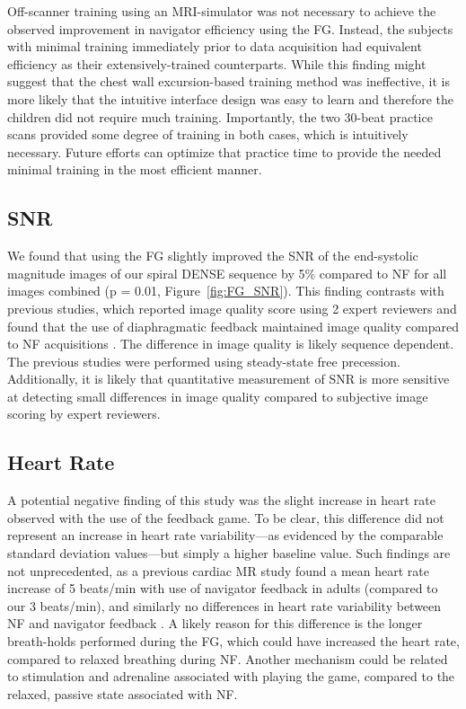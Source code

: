 		Off-scanner training using an MRI-simulator was not necessary to achieve the observed improvement in navigator efficiency using the FG. Instead, the subjects with minimal training immediately prior to data acquisition had equivalent efficiency as their extensively-trained counterparts. While this finding might suggest that the chest wall excursion-based training method was ineffective, it is more likely that the intuitive interface design was easy to learn and therefore the children did not require much training. Importantly, the two 30-beat practice scans provided some degree of training in both cases, which is intuitively necessary. Future efforts can optimize that practice time to provide the needed minimal training in the most efficient manner.
	
	\subsection{SNR}
		We found that using the FG slightly improved the SNR of the end-systolic magnitude images of our spiral DENSE sequence by 5\% compared to NF for all images combined (p = 0.01, Figure~\ref{fig:FG_SNR}). This finding contrasts with previous studies, which reported image quality score using 2 expert reviewers and found that the use of diaphragmatic feedback maintained image quality compared to NF acquisitions \cite{Feuerlein2009,Jhooti2011}. The difference in image quality is likely sequence dependent. The previous studies were performed using steady-state free precession. Additionally, it is likely that quantitative measurement of SNR is more sensitive at detecting small differences in image quality compared to subjective image scoring by expert reviewers.
	
	\subsection{Heart Rate}
		A potential negative finding of this study was the slight increase in heart rate observed with the use of the feedback game. To be clear, this difference did not represent an increase in heart rate variability—as evidenced by the comparable standard deviation values—but simply a higher baseline value. Such findings are not unprecedented, as a previous cardiac MR study found a mean heart rate increase of 5 beats/min with use of navigator feedback in adults (compared to our 3 beats/min), and similarly no differences in heart rate variability between NF and navigator feedback \cite{Feuerlein2009}. A likely reason for this difference is the longer breath-holds performed during the FG, which could have increased the heart rate, compared to relaxed breathing during NF. Another mechanism could be related to stimulation and adrenaline associated with playing the game, compared to the relaxed, passive state associated with NF.
		
